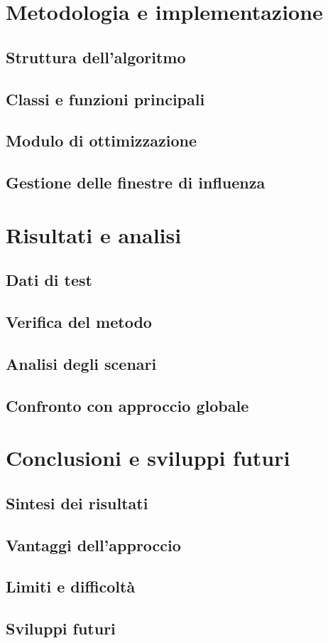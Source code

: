 \documentclass[a4paper,12pt]{report}
\begin{document}
\chapter{Metodologia e implementazione}
\section{Struttura dell’algoritmo}
\section{Classi e funzioni principali}
\section{Modulo di ottimizzazione}
\section{Gestione delle finestre di influenza}

\chapter{Risultati e analisi}
\section{Dati di test}
\section{Verifica del metodo}
\section{Analisi degli scenari}
\section{Confronto con approccio globale}

\chapter{Conclusioni e sviluppi futuri}
\section{Sintesi dei risultati}
\section{Vantaggi dell’approccio}
\section{Limiti e difficoltà}
\section{Sviluppi futuri}

\end{document}
